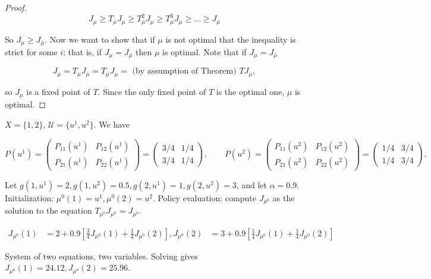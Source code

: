 \begin{enumerate}
\begin{proof}
\[
J_\mu \geq T_{\overline{\mu}} J_\mu \geq T_{\overline{\mu}}^2 J_\mu \geq T_{\overline{\mu}}^3 J_\mu \geq \ldots \geq J_{\overline{\mu}}
\]

So \(J_\mu \geq J_{\overline{\mu}}\). Now we want to show that if \(\mu\) is not optimal that the inequality is strict for some \(i\); that is, if \(J_\mu = J_{\overline{\mu}}\) then \(\mu\) is optimal. Note that if \(J_\mu = J_{\overline{\mu}}\)

\[
J_\mu = T_{\overline{\mu}}  J_{\overline{\mu}} =  T_{\overline{\mu}}  J_{\mu} = \text{ (by assumption of Theorem) } TJ_\mu,
\]

so \(J_\mu\) is a fixed point of \(T\). Since the only fixed point of \(T\) is the optimal one, \(\mu\) is optimal.

\end{proof}

\begin{example}

\(X = \{1,2\}\), \(\mathcal{U} = \{u^1, u^2\}\). We have

\[
P(u^1) = \begin{pmatrix}
P_{11}(u^1) & P_{12}(u^1)  \\
P_{21}(u^1)  & P_{22}(u^1) 
\end{pmatrix} =  \begin{pmatrix}
3/4  & 1/4 \\
3/4  & 1/4 
\end{pmatrix}  , \qquad P(u^2) = \begin{pmatrix}
P_{11}(u^2) & P_{12}(u^2)  \\
P_{21}(u^2)  & P_{22}(u^2) 
\end{pmatrix}  = \begin{pmatrix}
1/4 &  3/4  \\
1/4  & 3/4 
\end{pmatrix}, 
\]

Let \(g(1, u^1) = 2, g(1, u^2) = 0.5,  g(2, u^1) = 1, g(2, u^2) = 3\), and let \(\alpha= 0.9\). Initialization: \(\mu^0(1) = u^1, \mu^0(2) = u^2\). Policy evaluation: compute \(J_{\mu^0}\) as the solution to the equation \(T_{\mu^0} J_{\mu^0} = J_{\mu^0}\). 

\begin{align*}
J_{\mu^0}(1) & = 2 + 0.9 \left[ \frac{3}{4} J_{\mu^0}(1) + \frac{1}{4} J_{\mu^0}(2)  \right] ,
J_{\mu^0}(2) & = 3 + 0.9 \left[ \frac{1}{4} J_{\mu^0}(1) + \frac{1}{4} J_{\mu^0}(2)  \right] 
\end{align*}

System of two equations, two variables. Solving gives \(J_{\mu^0}(1) = 24.12, J_{\mu^0}(2) = 25.96\). 


\end{example}
\end{enumerate}
